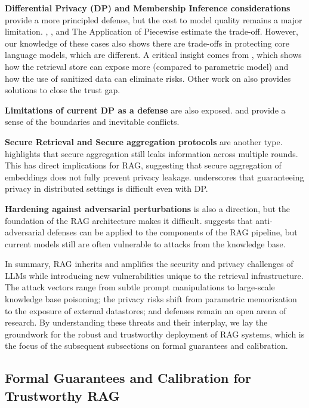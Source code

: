 \documentclass[11pt]{article}
\begin{document}
\textbf{Differential Privacy (DP) and Membership Inference considerations} provide a more principled defense, but the cost to model quality remains a major limitation. \cite{ref279}, \cite{ref280}, and \cite{ref281} The Application of Piecewise estimate the trade-off. However, our knowledge of these cases also shows there are trade-offs in protecting core language models, which are different. A critical insight comes from \cite{ref275}, which shows how the retrieval store can expose more (compared to parametric model) and how the use of sanitized data can eliminate risks. Other work on \cite{ref282} \cite{ref283} \cite{ref283} also provides solutions to close the trust gap.

\textbf{Limitations of current DP as a defense} are also exposed. \cite{ref284} and \cite{ref285} provide a sense of the boundaries and inevitable conflicts.

\textbf{Secure Retrieval and Secure aggregation protocols} are another type. \cite{ref286} highlights that secure aggregation still leaks information across multiple rounds. This has direct implications for RAG, suggesting that secure aggregation of embeddings does not fully prevent privacy leakage. \cite{ref287} underscores that guaranteeing privacy in distributed settings is difficult even with DP.

\textbf{Hardening against adversarial perturbations} is also a direction, but the foundation of the RAG architecture makes it difficult. \cite{ref288} suggests that anti-adversarial defenses can be applied to the components of the RAG pipeline, but current models still are often vulnerable to attacks from the knowledge base.

In summary, RAG inherits and amplifies the security and privacy challenges of LLMs while introducing new vulnerabilities unique to the retrieval infrastructure. The attack vectors range from subtle prompt manipulations to large-scale knowledge base poisoning; the privacy risks shift from parametric memorization to the exposure of external datastores; and defenses remain an open arena of research. By understanding these threats and their interplay, we lay the groundwork for the robust and trustworthy deployment of RAG systems, which is the focus of the subsequent subsections on formal guarantees and calibration.

\subsection{Formal Guarantees and Calibration for Trustworthy RAG}
\end{document}
